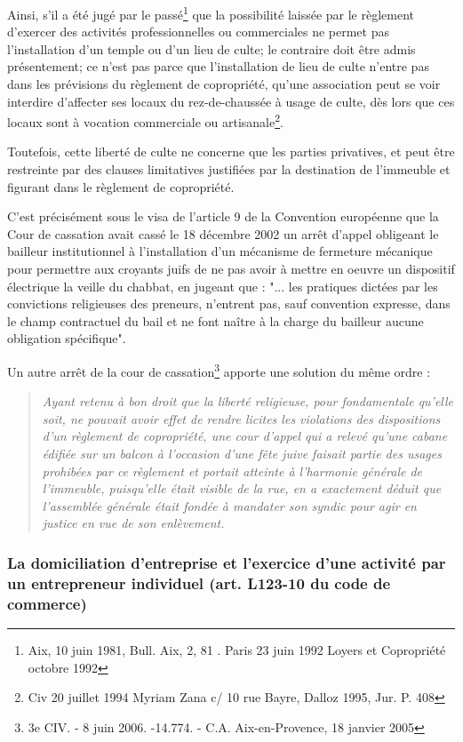 			Ainsi, s’il a été jugé par le passé\footnote{Aix, 10 juin 1981, Bull. Aix, 2, 81 . Paris 23 juin 1992 Loyers et Copropriété octobre 1992 } que la possibilité laissée par le règlement d'exercer des activités professionnelles ou commerciales ne permet pas l'installation d'un temple ou d'un lieu de culte; le contraire doit être admis présentement; ce n’est pas parce que l’installation de lieu de culte n’entre pas dans les prévisions du règlement de copropriété, qu’une association peut se voir interdire d’affecter ses locaux du rez-de-chaussée à usage de culte, dès lors que ces locaux sont à vocation commerciale ou artisanale\footnote{Civ 20 juillet 1994 Myriam Zana c/ 10 rue Bayre, Dalloz 1995, Jur. P. 408}.
	
			Toutefois, cette liberté de culte ne concerne que les parties privatives, et peut être restreinte par des clauses limitatives justifiées par la destination de l’immeuble et figurant dans le règlement de copropriété.
			
			C’est précisément sous le visa de l'article 9 de la Convention européenne que la Cour de cassation avait cassé le 18 décembre 2002 un arrêt d'appel obligeant le bailleur institutionnel à l'installation d'un mécanisme de fermeture mécanique pour permettre aux croyants juifs de ne pas avoir à mettre en oeuvre un dispositif électrique la veille du chabbat, en jugeant que : "... les pratiques dictées par les convictions religieuses des preneurs, n'entrent pas, sauf convention expresse, dans le champ contractuel du bail et ne font naître à la charge du bailleur aucune obligation spécifique".
			
			Un autre arrêt de la cour de cassation\footnote{3e CIV. - 8 juin 2006. -14.774. - C.A. Aix-en-Provence, 18 janvier 2005} apporte une solution du même ordre :
			\begin{quote}
				\itshape
				Ayant retenu à bon droit que la liberté religieuse, pour fondamentale qu'elle soit, ne pouvait avoir effet de rendre licites les violations des dispositions d'un règlement de copropriété, une cour d'appel qui a relevé qu'une cabane édifiée sur un balcon à l'occasion d'une fête juive faisait partie des usages prohibées par ce règlement et portait atteinte à l'harmonie générale de l'immeuble, puisqu'elle était visible de la rue, en a exactement déduit que l'assemblée générale était fondée à mandater son syndic pour agir en justice en vue de son enlèvement.
			\end{quote}
		
		\subsubsection{La domiciliation d’entreprise et l’exercice d’une activité par un entrepreneur individuel (art. L123-10 du code de commerce)}
		
